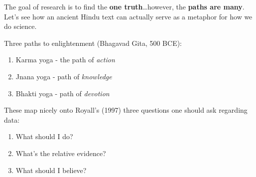 \documentclass{foils}
\begin{document}
\label{sec-3}
The goal of research is to find the \textbf{one truth}\ldots{}however, the \textbf{paths are many}.  Let's see how an ancient Hindu text can actually serve as a metaphor for how we do science.

Three paths to enlightenment (Bhagavad Gita, 500 BCE):
\begin{enumerate}
\item Karma yoga - the path of \emph{action}
\item Jnana yoga - path of \emph{knowledge}
\item Bhakti yoga - path of \emph{devotion}
\end{enumerate}

These map nicely onto Royall's (1997) three questions one should ask regarding data:
\begin{enumerate}
\item What should I do?
\item What's the relative evidence?
\item What should I believe?
\end{enumerate}
\end{document}
